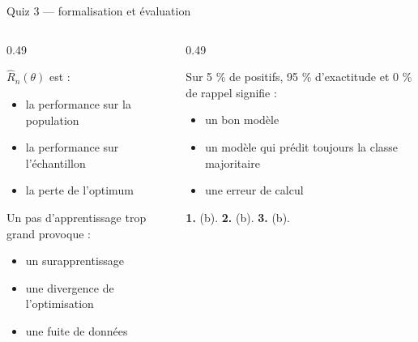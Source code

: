 \begin{frame}{Quiz 3 --- formalisation et évaluation}
\begin{columns}[t]
\begin{column}{0.49\textwidth}
\begin{qbox}[Question 1]
$\hat R_n(\theta)$ est :
\begin{itemize}
  \item[(a)] la performance sur la population
  \item[(b)] la performance sur l'échantillon
  \item[(c)] la perte de l'optimum
\end{itemize}
\end{qbox}
\begin{qbox}[Question 2]
Un pas d'apprentissage trop grand provoque :
\begin{itemize}
  \item[(a)] un surapprentissage
  \item[(b)] une divergence de l'optimisation
  \item[(c)] une fuite de données
\end{itemize}
\end{qbox}
\end{column}
\begin{column}{0.49\textwidth}
\begin{qbox}[Question 3]
Sur 5 \% de positifs, 95 \% d'exactitude et 0 \% de rappel signifie :
\begin{itemize}
  \item[(a)] un bon modèle
  \item[(b)] un modèle qui prédit toujours la classe majoritaire
  \item[(c)] une erreur de calcul
\end{itemize}
\end{qbox}
\begin{solbox}[Réponses]
\textbf{1.} (b). \quad \textbf{2.} (b). \quad \textbf{3.} (b).
\end{solbox}
\end{column}
\end{columns}
\end{frame}


